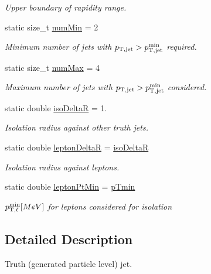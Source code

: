 \begin{DoxyCompactItemize}
\begin{DoxyCompactList}\small\item\em Upper boundary of rapidity range. \end{DoxyCompactList}\item 
static size\+\_\+t \hyperlink{namespaceAnalysis_1_1Select_1_1TruthJet_aa181b8b794140e329394a3a941e18138}{num\+Min} = 2
\begin{DoxyCompactList}\small\item\em Minimum number of jets with $ p_{\rm T,jet} > p_{\rm T,jet}^{\rm min} $ required. \end{DoxyCompactList}\item 
static size\+\_\+t \hyperlink{namespaceAnalysis_1_1Select_1_1TruthJet_a3e73a3d49de39243c85530cbc79563b6}{num\+Max} = 4
\begin{DoxyCompactList}\small\item\em Maximum number of jets with $ p_{\rm T,jet} > p_{\rm T,jet}^{\rm min} $ considered. \end{DoxyCompactList}\item 
static double \hyperlink{namespaceAnalysis_1_1Select_1_1TruthJet_a194aba6714870814928ce1f6490f42cf}{iso\+DeltaR} = 1.
\begin{DoxyCompactList}\small\item\em Isolation radius against other truth jets. \end{DoxyCompactList}\item 
static double \hyperlink{namespaceAnalysis_1_1Select_1_1TruthJet_a697911d5caa69806e031195dc61cade4}{lepton\+DeltaR} = \hyperlink{namespaceAnalysis_1_1Select_1_1TruthJet_a194aba6714870814928ce1f6490f42cf}{iso\+DeltaR}
\begin{DoxyCompactList}\small\item\em Isolation radius against leptons. \end{DoxyCompactList}\item 
static double \hyperlink{namespaceAnalysis_1_1Select_1_1TruthJet_ad6f1403d6765ca907d71e550adf59b0d}{lepton\+Pt\+Min} = \hyperlink{namespaceAnalysis_1_1Select_1_1TruthJet_a861b3fa8b899e322a5f8a8d04a707220}{p\+Tmin}
\begin{DoxyCompactList}\small\item\em $ p_{{\rm T},\ell}^{\rm min} [MeV] $ for leptons considered for isolation \end{DoxyCompactList}\end{DoxyCompactItemize}


\subsection{Detailed Description}
Truth (generated particle level) jet. 

